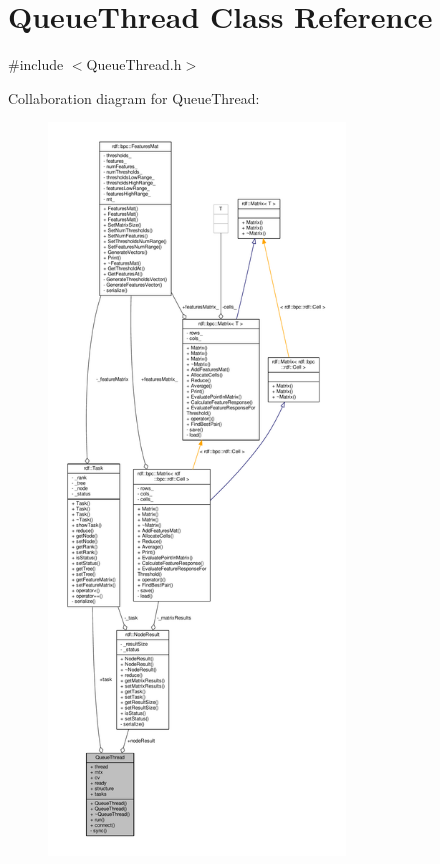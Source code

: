 \hypertarget{classQueueThread}{}\section{Queue\+Thread Class Reference}
\label{classQueueThread}


{\ttfamily \#include $<$Queue\+Thread.\+h$>$}



Collaboration diagram for Queue\+Thread\+:
\nopagebreak
\begin{figure}[H]
\begin{center}
\leavevmode
\includegraphics[height=550pt]{classQueueThread__coll__graph}
\end{center}
\end{figure}
